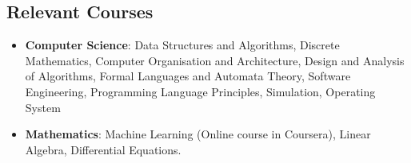 \documentclass[margin, centered]{res}
\begin{document}
\begin{resume}
\section{Relevant \hspace{2mm} Courses}
\begin{itemize}[leftmargin=*]
\item  \textbf{Computer Science}: Data Structures and Algorithms, Discrete Mathematics, Computer Organisation and 
Architecture, Design and Analysis of Algorithms, Formal Languages and Automata Theory, Software
Engineering, Programming Language Principles, Simulation, Operating System
\item  \textbf{Mathematics}: Machine Learning (Online course in Coursera), Linear Algebra,
Differential Equations.
\end{itemize}


\end{resume}
\end{document}
